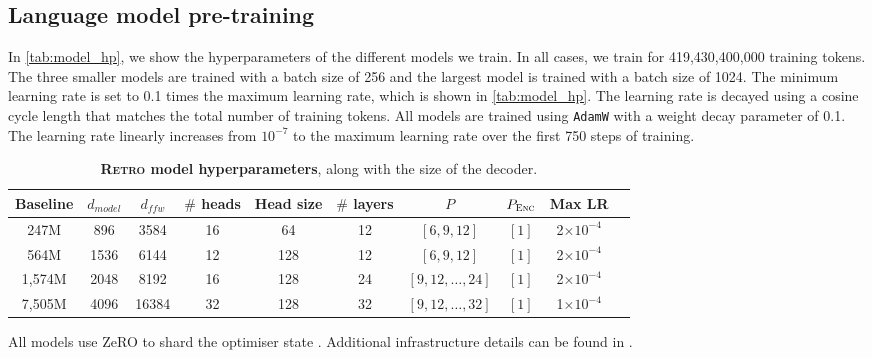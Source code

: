 \documentclass[11pt, a4paper, logo]{deepmind}
\newcommand{\retro}{\textsc{Retro}\xspace}
\begin{document}
\subsection{Language model pre-training}
In \autoref{tab:model_hp}, we show the hyperparameters of the different models we train. In all cases, we train for 419,430,400,000 training tokens.
The three smaller models are trained with a batch size of 256 and the largest model is trained with a batch size of 1024. 
The minimum learning rate is set to 0.1 times the maximum learning rate, which is shown in \autoref{tab:model_hp}.
The learning rate is decayed using a cosine cycle length that matches the total number of training tokens.
All models are trained using \texttt{AdamW} \citep{loshchilov2018decoupled} with a weight decay parameter of 0.1.
The learning rate linearly increases from $10^{-7}$ to the maximum learning rate over the first 750 steps of training.
\begin{table}[h]
    \caption{\textbf{\retro model hyperparameters}, along with the size of the decoder.}
    
    \small
    \vspace{2.0mm}
    
    \centering
    \begin{tabular}{c c c c c c c c c c}
        Baseline & $d_{model}$ & $d_{ffw}$ & $\#$ heads & Head size & $\#$ layers & $P$ & $P_{\textsc{Enc}}$ & Max LR \\ 
        \toprule
        247M  & 896 & 3584 & 16 & 64 & 12 & $[6, 9, 12]$ & $[1]$ & 2$\times10^{-4}$   \\
        564M  & 1536 & 6144 & 12 & 128 & 12 & $[6, 9, 12]$ & $[1]$ & 2$\times10^{-4}$ \\
        1,574M & 2048 & 8192 & 16 & 128 & 24 & $[9, 12, \dots, 24]$ & $[1]$ & 2$\times10^{-4}$ \\
        7,505M & 4096 & 16384 & 32 & 128 & 32 & $[9, 12, \dots, 32]$ & $[1]$ & 1$\times10^{-4}$ \\
    \end{tabular}

    \label{tab:model_hp}
\end{table}
All models use ZeRO to shard the optimiser state \citep{rajbhandari_zero_2020}.
Additional infrastructure details can be found in \cite{rae2021gopher}.
\end{document}

